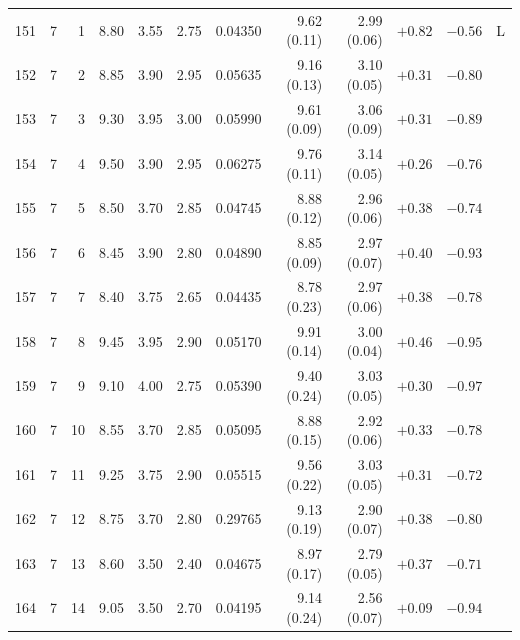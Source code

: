 \begin{longtable}{@{}rrrrrrrrrrrr@{}}
151 & 7 & 1 & \num{8.80} & \num{3.55} & \num{2.75} & \num{0.04350} & \num{9.62} (\num{0.11}) & \num{2.99} (\num{0.06}) & $+\num{0.82}$ & $-\num{0.56}$ & L \\
152 & 7 & 2 & \num{8.85} & \num{3.90} & \num{2.95} & \num{0.05635} & \num{9.16} (\num{0.13}) & \num{3.10} (\num{0.05}) & $+\num{0.31}$ & $-\num{0.80}$ &  \\
153 & 7 & 3 & \num{9.30} & \num{3.95} & \num{3.00} & \num{0.05990} & \num{9.61} (\num{0.09}) & \num{3.06} (\num{0.09}) & $+\num{0.31}$ & $-\num{0.89}$ &  \\
154 & 7 & 4 & \num{9.50} & \num{3.90} & \num{2.95} & \num{0.06275} & \num{9.76} (\num{0.11}) & \num{3.14} (\num{0.05}) & $+\num{0.26}$ & $-\num{0.76}$ &  \\
155 & 7 & 5 & \num{8.50} & \num{3.70} & \num{2.85} & \num{0.04745} & \num{8.88} (\num{0.12}) & \num{2.96} (\num{0.06}) & $+\num{0.38}$ & $-\num{0.74}$ &  \\
156 & 7 & 6 & \num{8.45} & \num{3.90} & \num{2.80} & \num{0.04890} & \num{8.85} (\num{0.09}) & \num{2.97} (\num{0.07}) & $+\num{0.40}$ & $-\num{0.93}$ &  \\
157 & 7 & 7 & \num{8.40} & \num{3.75} & \num{2.65} & \num{0.04435} & \num{8.78} (\num{0.23}) & \num{2.97} (\num{0.06}) & $+\num{0.38}$ & $-\num{0.78}$ &  \\
158 & 7 & 8 & \num{9.45} & \num{3.95} & \num{2.90} & \num{0.05170} & \num{9.91} (\num{0.14}) & \num{3.00} (\num{0.04}) & $+\num{0.46}$ & $-\num{0.95}$ &  \\
159 & 7 & 9 & \num{9.10} & \num{4.00} & \num{2.75} & \num{0.05390} & \num{9.40} (\num{0.24}) & \num{3.03} (\num{0.05}) & $+\num{0.30}$ & $-\num{0.97}$ &  \\
160 & 7 & 10 & \num{8.55} & \num{3.70} & \num{2.85} & \num{0.05095} & \num{8.88} (\num{0.15}) & \num{2.92} (\num{0.06}) & $+\num{0.33}$ & $-\num{0.78}$ &  \\
161 & 7 & 11 & \num{9.25} & \num{3.75} & \num{2.90} & \num{0.05515} & \num{9.56} (\num{0.22}) & \num{3.03} (\num{0.05}) & $+\num{0.31}$ & $-\num{0.72}$ &  \\
162 & 7 & 12 & \num{8.75} & \num{3.70} & \num{2.80} & \num{0.29765} & \num{9.13} (\num{0.19}) & \num{2.90} (\num{0.07}) & $+\num{0.38}$ & $-\num{0.80}$ &  \\
163 & 7 & 13 & \num{8.60} & \num{3.50} & \num{2.40} & \num{0.04675} & \num{8.97} (\num{0.17}) & \num{2.79} (\num{0.05}) & $+\num{0.37}$ & $-\num{0.71}$ &  \\
164 & 7 & 14 & \num{9.05} & \num{3.50} & \num{2.70} & \num{0.04195} & \num{9.14} (\num{0.24}) & \num{2.56} (\num{0.07}) & $+\num{0.09}$ & $-\num{0.94}$ &  \\

\end{longtable}
